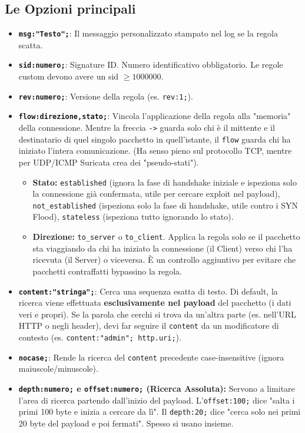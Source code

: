 \documentclass[12pt,a4paper]{report}
\begin{document}
	\subsection{Le Opzioni principali}
	\begin{itemize}
		\item \textbf{\texttt{msg:"Testo";}}: Il messaggio personalizzato stampato nel log se la regola scatta.
		\item \textbf{\texttt{sid:numero;}}: Signature ID. Numero identificativo obbligatorio. Le regole custom devono avere un sid $\ge 1000000$.
		\item \textbf{\texttt{rev:numero;}}: Versione della regola (es. \texttt{rev:1;}).
		\item \textbf{\texttt{flow:direzione,stato;}}: Vincola l'applicazione della regola alla "memoria" della connessione. Mentre la freccia \texttt{->} guarda solo chi è il mittente e il destinatario di quel singolo pacchetto in quell'istante, il \texttt{flow} guarda chi ha iniziato l'intera comunicazione. (Ha senso pieno sul protocollo TCP, mentre per UDP/ICMP Suricata crea dei "pseudo-stati").
		\begin{itemize}
			\item \textbf{Stato:} \texttt{established} (ignora la fase di handshake iniziale e ispeziona solo la connessione già confermata, utile per cercare exploit nel payload), \texttt{not\_established} (ispeziona solo la fase di handshake, utile contro i SYN Flood), \texttt{stateless} (ispeziona tutto ignorando lo stato).
			\item \textbf{Direzione:} \texttt{to\_server} o \texttt{to\_client}. Applica la regola solo se il pacchetto sta viaggiando da chi ha iniziato la connessione (il Client) verso chi l'ha ricevuta (il Server) o viceversa. È un controllo aggiuntivo per evitare che pacchetti contraffatti bypassino la regola.
		\end{itemize}
		\item \textbf{\texttt{content:"stringa";}}: Cerca una sequenza esatta di testo. Di default, la ricerca viene effettuata \textbf{esclusivamente nel payload} del pacchetto (i dati veri e propri). Se la parola che cerchi si trova da un'altra parte (es. nell'URL HTTP o negli header), devi far seguire il \texttt{content} da un modificatore di contesto (es. \texttt{content:"admin"; http.uri;}).
		\item \textbf{\texttt{nocase;}}: Rende la ricerca del \texttt{content} precedente case-insensitive (ignora maiuscole/minuscole).
		\item \textbf{\texttt{depth:numero;} e \textbf{\texttt{offset:numero;}} (Ricerca Assoluta):} Servono a limitare l'area di ricerca partendo dall'inizio del payload. L'\texttt{offset:100;} dice "salta i primi 100 byte e inizia a cercare da lì". Il \texttt{depth:20;} dice "cerca solo nei primi 20 byte del payload e poi fermati". Spesso si usano insieme.

\end{itemize}
\end{document}
